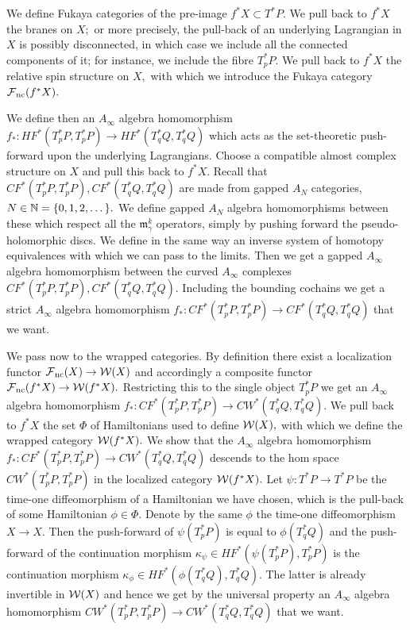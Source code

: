 \documentclass{article}
\DeclareMathOperator{\Mod}{mod}\DeclareMathOperator{\supp}{supp}\DeclareMathOperator{\obj}{obj}
\theoremstyle{plain}%
\theoremstyle{definition}
\numberwithin{equation}{section}
\numberwithin{figure}{section}
\def\fm{{\mathfrak m}}
\def\cF{{\mathbin{\cal F}}}
\def\cW{{\mathbin{\cal W}}}
\def\ga{\gamma}
\def\ka{\kappa}
\def\ph{\phi}
\def\Ph{\Phi}
\def\ps{\psi}
\def\iy{\infty}
\begin{document}
We define Fukaya categories of the pre-image $f^*X\subset T^*P.$ We pull back to $f^*X$ the branes on $X;$ or more precisely, the pull-back of an underlying Lagrangian in $X$ is possibly disconnected, in which case we include all the connected components of it; for instance, we include the fibre $T_p^*P.$ We pull back to $f^*X$ the relative spin structure on $X,$ with which we introduce the Fukaya category $\cF_\nc(f^*X).$


We define then an $A_\iy$ algebra homomorphism $f_*:HF^*(T_p^*P,T_p^*P)\to HF^*(T_q^*Q,T_q^*Q)$ which acts as the set-theoretic push-forward upon the underlying Lagrangians. Choose a compatible almost complex structure on $X$ and pull this back to $f^*X.$ Recall that $CF^*(T_p^*P,T_p^*P), CF^*(T_q^*Q,T_q^*Q)$ are made from gapped $A_N$ categories, $N\in{\mathbb N}=\{0,1,2,\dots\}.$ We define gapped $A_N$ algebra homomorphisms between these which respect all the $\fm^k_\ga$ operators, simply by pushing forward the pseudo-holomorphic discs. We define in the same way an inverse system of homotopy equivalences with which we can pass to the limits. Then we get a gapped $A_\iy$ algebra homomorphism between the curved $A_\iy$ complexes $CF^*(T_p^*P,T_p^*P),CF^*(T_q^*Q,T_q^*Q).$ Including the bounding cochains we get a strict $A_\iy$ algebra homomorphism $f_*:CF^*(T_p^*P,T_p^*P)\to CF^*(T_q^*Q,T_q^*Q)$ that we want.

We pass now to the wrapped categories. By definition there exist a localization functor $\cF_\nc(X)\to \cW(X)$ and accordingly a composite functor $\cF_\nc(f^*X)\to \cW(f^*X).$ Restricting this to the single object $T_p^*P$ we get an $A_\iy$ algebra homomorphism $f_*:CF^*(T_p^*P,T_p^*P)\to CW^*(T_q^*Q,T_q^*Q).$ We pull back to $f^*X$ the set $\Ph$ of Hamiltonians used to define $\cW(X),$ with which we define the wrapped category $\cW(f^*X).$ We show that the $A_\iy$ algebra homomorphism $f_*:CF^*(T_p^*P,T_p^*P)\to CW^*(T_q^*Q,T_q^*Q)$ descends to the hom space $CW^*(T_p^*P,T_p^*P)$ in the localized category $\cW(f^*X).$ Let $\ps:T^*P\to T^*P$ be the time-one diffeomorphism of a Hamiltonian we have chosen, which is the pull-back of some Hamiltonian $\ph\in\Ph.$ Denote by the same $\ph$ the time-one diffeomorphism $X\to X.$ Then the push-forward of $\ps(T_p^*P)$ is equal to $\ph(T_q^*Q)$ and the push-forward of the continuation morphism $\ka_\ps\in HF^*(\ps(T_p^*P),T_p^*P)$ is the continuation morphism $\ka_\ph\in HF^*(\ph(T_q^*Q),T_q^*Q).$ The latter is already invertible in $\cW(X)$ and hence we get by the universal property an $A_\iy$ algebra homomorphism  $CW^*(T_p^*P,T_p^*P)\to CW^*(T_q^*Q,T_q^*Q)$ that we want. 
\end{document}
